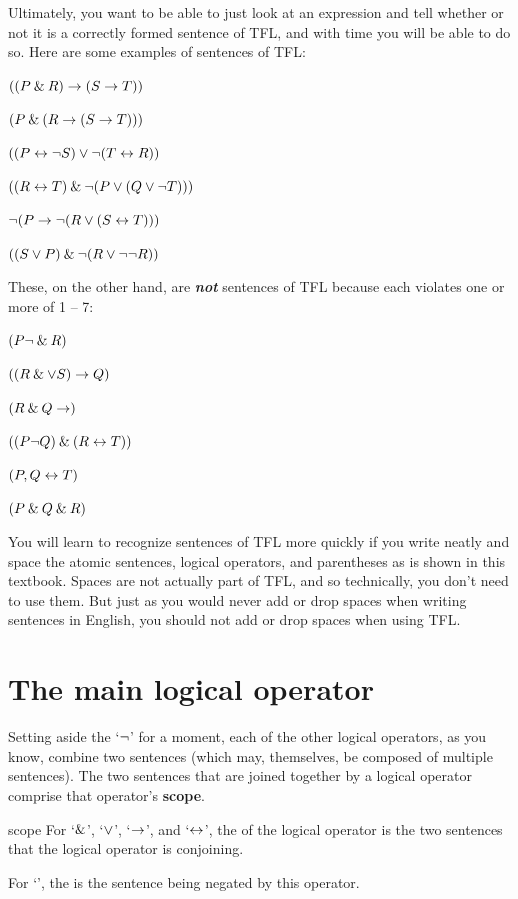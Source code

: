 Ultimately, you want to be able to just look at an expression and tell whether or not it is a correctly formed sentence of TFL, and with time you will be able to do so. Here are some examples of sentences of TFL:
\begin{earg}
\item $((P \mathbin{\&} R) \rightarrow (S \rightarrow T))$
\item $(P \mathbin{\&} (R \rightarrow (S \rightarrow T)))$
\item $((P \leftrightarrow {\neg} S) \vee {\neg}(T \leftrightarrow R))$
\item $((R \leftrightarrow T) \mathbin{\&} {\neg}(P \vee (Q \vee {\neg} T)))$
\item ${\neg}(P \rightarrow {\neg}(R \vee (S \leftrightarrow T)))$
\item $((S \vee P) \mathbin{\&} {\neg}(R \vee {\neg}{\neg} R))$
\end{earg}
These, on the other hand, are \textit{\textbf{not}} sentences of TFL because each violates one or more of 1 -- 7:
\begin{earg}
\item $(P{\neg} \mathbin{\&} R)$
\item $((R \mathbin{\&} \vee S) \rightarrow Q)$
\item $(R \mathbin{\&} Q \rightarrow)$
\item $((P {\neg} Q) \mathbin{\&} (R \leftrightarrow T))$
\item $(P,Q \leftrightarrow T)$
\item $(P \mathbin{\&} Q \mathbin{\&} R)$
\end{earg}

You will learn to recognize sentences of TFL more quickly if you write neatly and space the atomic sentences, logical operators, and parentheses as is shown in this textbook. Spaces are not actually part of TFL, and so technically, you don't need to use them. But just as you would never add or drop spaces when writing sentences in English, you should not add or drop spaces when using TFL.


\section{The main logical operator}
\label{main_logical_operator}

Setting aside the `${\neg}$' for a moment, each of the other logical operators, as you know, combine two sentences (which may, themselves, be composed of multiple sentences). The two sentences that are joined together by a logical operator comprise that operator's \textbf{scope}. 

\begin{factboxy}{scope}
For `$\mathbin{\&}$', `$\vee$', `$\rightarrow$', and `$\leftrightarrow$', the  of the logical operator is the two sentences that the logical operator is conjoining. 
\smallskip

For `\enot', the  is the sentence being negated by this operator.
\end{factboxy}

